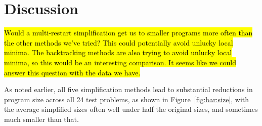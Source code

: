 \section{Discussion}
\label{sec:discussion}


%
%
%
%
%

\hl{    Would a multi-restart simplification get us to smaller programs more often than the other methods we've tried? This could potentially avoid unlucky local minima. The backtracking methods are also trying to avoid unlucky local minima, so this would be an interesting comparison. It seems like we could answer this question with the data we have.}


As noted earlier, all five simplification methods lead to substantial
reductions in program size across all 24 test problems, as shown in
Figure~\ref{fig:bar:size}, with the average simplified sizes often 
well under half the original sizes, and sometimes much smaller than that.

